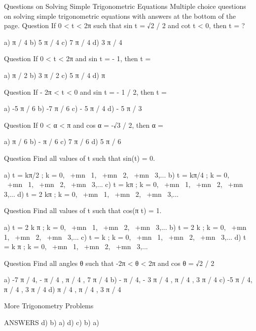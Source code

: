 

Questions on Solving Simple Trigonometric Equations
Multiple choice questions on solving simple trigonometric equations with answers at the bottom of the page. 
Question If 0 < t < 2π such that sin t = √2 / 2 and cot t < 0, then t = ? 

a) π / 4 
b) 5 π / 4 
c) 7 π / 4 
d) 3 π / 4 


Question If 0 < t < 2π and sin t = - 1, then t = 

a) π / 2 
b) 3 π / 2 
c) 5 π / 4 
d) π 

Question If - 2π < t < 0 and sin t = - 1 / 2, then t = 

a) -5 π / 6 
b) -7 π / 6 
c) - 5 π / 4 
d) - 5 π / 3 


Question If 0 < α < π and cos α = -√3 / 2, then α = 

a) π / 6 
b) - π / 6 
c) 7 π / 6 
d) 5 π / 6 

Question Find all values of t such that sin(t) = 0. 

a) t = kπ/2 ; k = 0, ~+mn~ 1, ~+mn~ 2, ~+mn~ 3,... 
b) t = kπ/4 ; k = 0, ~+mn~ 1, ~+mn~ 2, ~+mn~ 3,... 
c) t = kπ ; k = 0, ~+mn~ 1, ~+mn~ 2, ~+mn~ 3,... 
d) t = 2 kπ ; k = 0, ~+mn~ 1, ~+mn~ 2, ~+mn~ 3,... 

Question Find all values of t such that cos(π t) = 1. 

a) t = 2 k π ; k = 0, ~+mn~ 1, ~+mn~ 2, ~+mn~ 3,... 
b) t = 2 k ; k = 0, ~+mn~ 1, ~+mn~ 2, ~+mn~ 3,... 
c) t = k ; k = 0, ~+mn~ 1, ~+mn~ 2, ~+mn~ 3,... 
d) t = k π ; k = 0, ~+mn~ 1, ~+mn~ 2, ~+mn~ 3,... 


Question Find all angles θ such that -2π < θ < 2π and cos θ = √2 / 2 

a) {-7 π / 4, - π / 4 , π / 4 , 7 π / 4} 
b) {- π / 4, - 3 π / 4 , π / 4 , 3 π / 4} 
c) {-5 π / 4, π / 4 , 3 π / 4} 
d) {π / 4 , π / 4 , 3 π / 4} 


More 
Trigonometry Problems 

ANSWERS 
d) 
b) 
a) 
d) 
c) 
b) 
a) 



